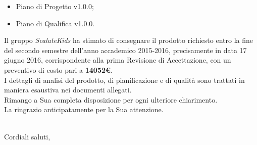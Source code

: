 \documentclass[10pt,a4paper]{letter} %
\begin{document}
\begin{letter}{}
\begin{itemize}
\begin{itemize}
    \item Piano di Progetto v1.0.0;
    \item Piano di Qualifica v1.0.0.
    \end{itemize}
  \end{itemize}
  Il gruppo \textit{ScalateKids} ha stimato di consegnare il prodotto richiesto entro la fine del secondo semestre dell'anno accademico 2015-2016,
  precisamente in data 17 giugno 2016, corrispondente alla prima Revisione di Accettazione, con un preventivo di costo pari a \textbf{14052\euro{}}.\\
  I dettagli di analisi del prodotto, di pianificazione e di qualità sono trattati in maniera esaustiva nei documenti allegati.\\
  Rimango a Sua completa disposizione per ogni ulteriore chiarimento.\\
  La ringrazio anticipatamente per la Sua attenzione. \\ \\ 
  \closing{Cordiali saluti,}

\end{letter}
\end{document}
